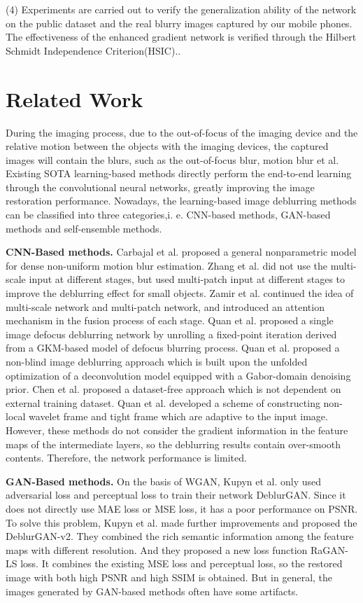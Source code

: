 \begin{sloppypar}
(4) Experiments are carried out to verify the generalization ability of the network on the public dataset and the real blurry images captured by our mobile phones. The effectiveness of the enhanced gradient network is verified through the Hilbert Schmidt Independence Criterion(HSIC).\cite{10}. 

\section{Related Work}
\label{sec:1}
During the imaging process, due to the out-of-focus of the imaging device and the relative motion between the objects with the imaging devices, the captured images will contain the blurs, such as the out-of-focus blur, motion blur et al. Existing SOTA learning-based methods\cite{6}\cite{7}\cite{8}\cite{9} directly perform the end-to-end learning through the convolutional neural networks, greatly improving the image restoration performance. Nowadays, the learning-based image deblurring methods can be classified into three categories,i. e. CNN-based methods, GAN-based methods and self-ensemble methods.

{\bfseries CNN-Based methods.} Carbajal et al.\cite{1} proposed a general nonparametric model for dense non-uniform motion blur estimation. Zhang et al.\cite{6} did not use the multi-scale input at different stages, but used multi-patch input at different stages to improve the deblurring effect for small objects. Zamir et al.\cite{7} continued the idea of multi-scale network and multi-patch network, and introduced an attention mechanism in the fusion process of each stage. Quan et al.\cite{11} proposed a single image defocus deblurring network by unrolling a fixed-point iteration derived from a GKM-based model of defocus blurring process. Quan et al.\cite{12} proposed a non-blind image deblurring approach which is built upon the unfolded optimization of a deconvolution model equipped with a Gabor-domain denoising prior. Chen et al.\cite{13} proposed a dataset-free approach which is not dependent on external training dataset. Quan et al.\cite{14} developed a scheme of constructing non-local wavelet frame and tight frame which are adaptive to the input image.  However, these methods do not consider the gradient information in the feature maps of the intermediate layers, so the deblurring results contain over-smooth contents. Therefore, the network performance is limited.

{\bfseries GAN-Based methods.} On the basis of WGAN\cite{15}\cite{16}, Kupyn et al.\cite{17} only used adversarial loss and perceptual loss to train their network DeblurGAN. Since it does not directly use MAE loss or MSE loss, it has a poor performance on PSNR. To solve this problem, Kupyn et al.\cite{18} made further improvements and proposed the DeblurGAN-v2. They combined the rich semantic information among the feature maps with different resolution. And they proposed a new loss function RaGAN-LS loss. It combines the existing MSE loss and perceptual loss, so the restored image with both high PSNR and high SSIM is obtained. But in general, the images generated by GAN-based methods often have some artifacts.


\end{sloppypar}
